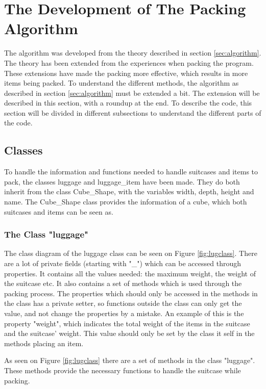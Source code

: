 \section{The Development of The Packing Algorithm}
\label{sec:devalgorithm}
The algorithm was developed from the theory described in section \ref{sec:algorithm}. The theory has been extended from the experiences when packing the program. These extensions have made the packing more effective, which results in more items being packed. 
To understand the different methods, the algorithm as described in section \ref{sec:algorithm} must be extended a bit. The extension will be described in this section, with a roundup at the end. To describe the code, this section will be divided in different subsections to understand the different parts of the code.

\subsection{Classes}
To handle the information and functions needed to handle suitcases and items to pack, the classes luggage and luggage\_item have been made. They do both inherit from the class Cube\_Shape, with the variables width, depth, height and name. The Cube\_Shape class provides the information of a cube, which both suitcases and items can be seen as.
\subsubsection{The Class "luggage"}
The class diagram of the luggage class can be seen on Figure \ref{fig:lugclass}. There are a lot of private fields (starting with "\_") which can be accessed through properties. It contains all the values needed: the maximum weight, the weight of the suitcase etc. It also contains a set of methods which is used through the packing process. The properties which should only be accessed in the methods in the class has a private setter, so functions outside the class can only get the value, and not change the properties by a mistake. An example of this is the property "weight", which indicates the total weight of the items in the suitcase and the suitcase' weight. This value should only be set by the class it self in the methods placing an item.


As seen on Figure \ref{fig:lugclass} there are a set of methods in the class "luggage". These methods provide the necessary functions to handle the suitcase while packing.

